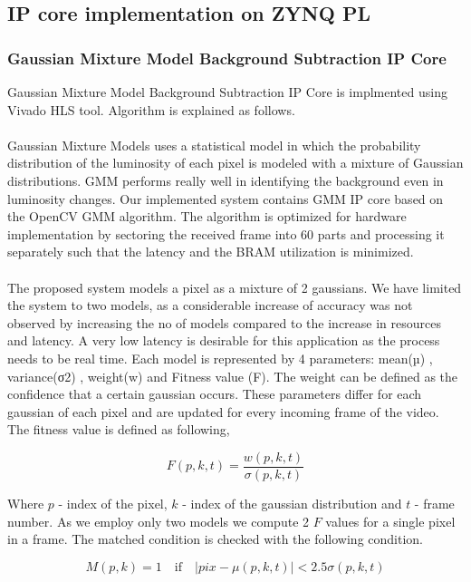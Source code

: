 \documentclass[12pt,a4paper]{report}
\begin{document}
\subsection{IP core implementation on ZYNQ PL}

\subsubsection{Gaussian Mixture Model Background Subtraction IP Core}

Gaussian Mixture Model Background Subtraction IP Core is implmented using Vivado HLS tool. Algorithm is explained as follows.\\\\
Gaussian Mixture Models uses a statistical model in which the probability distribution of the luminosity of each pixel is modeled with a mixture of Gaussian distributions. GMM performs really well in identifying the background even in luminosity changes. Our implemented system contains GMM IP core based on the OpenCV GMM algorithm.  The algorithm is optimized for hardware implementation by sectoring the received frame into 60 parts and processing it separately such that the latency and the BRAM utilization is minimized.\\\\
The proposed system models a pixel as a mixture of 2 gaussians. We have limited the system to two models, as a considerable increase of accuracy was not observed by increasing the no of models compared to the increase in resources and latency. A very low latency is desirable for this application as the process needs to be real time. Each model is represented by 4 parameters: mean(µ) , variance(σ2) , weight(w) and Fitness value (F). The weight can be defined as the confidence that a certain gaussian occurs. These parameters differ for each gaussian of each pixel and are updated for every incoming frame of the video.\\
The fitness value is defined as following,

\begin{equation}
F(p,k,t)=\frac{w(p,k,t)}{\sigma(p,k,t)}
\end{equation}

Where $p$ - index of the pixel, $k$ - index of the gaussian distribution and $t$ - frame number. As we employ only two models we compute 2 $F$ values for a single pixel in a frame. The matched condition is checked with the following condition. 

\begin{equation}
M(p,k)=1 \quad \textrm{if}  \quad |pix- \mu(p,k,t)| < 2.5\sigma(p,k,t)
\end{equation}
\end{document}
